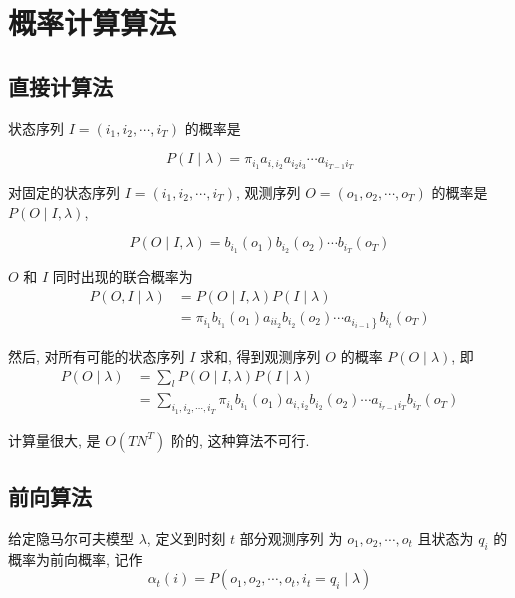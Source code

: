 \section{概率计算算法}

\subsection{直接计算法}

状态序列 $ I=\left(i_{1}, i_{2}, \cdots, i_{T}\right) $ 的概率是

$$ P(I \mid \lambda)=\pi_{i_{1}} a_{i, i_{2}} a_{i_{2} i_{3}} \cdots a_{i_{T-1} i_{T}} $$


对固定的状态序列 $ I=\left(i_{1}, i_{2}, \cdots, i_{T}\right) $, 观测序列 $ O=\left(o_{1}, o_{2}, \cdots, o_{T}\right) $ 的概率是 $ P(O \mid I, \lambda) $,

$$ P(O \mid I, \lambda)=b_{i_{1}}\left(o_{1}\right) b_{i_{2}}\left(o_{2}\right) \cdots b_{i_{T}}\left(o_{T}\right) $$

$ O $ 和 $ I $ 同时出现的联合概率为
$$ 
\begin{aligned}
    P(O, I \mid \lambda)&=P(O \mid I, \lambda) P(I \mid \lambda)\\
    &=\pi_{i_{1}} b_{i_{1}}\left(o_{1}\right) a_{i i_{2}} b_{i_{2}}\left(o_{2}\right) \cdots a_{\left.i_{i-1}\right\}} b_{i_{t}}\left(o_{T}\right)
\end{aligned}
$$

然后, 对所有可能的状态序列 $ I $ 求和, 得到观测序列 $ O $ 的概率 $ P(O \mid \lambda) $, 即
$$ 
\begin{aligned}
    P(O \mid \lambda)
&=\sum_{l} P(O \mid I, \lambda) P(I \mid \lambda) \\
&= \sum_{i_{1}, i_{2}, \cdots, i_{T}} \pi_{i_{1}} b_{i_{1}}\left(o_{1}\right) a_{i, i_{2}} b_{i_{2}}\left(o_{2}\right) \cdots a_{i_{r-1} i_{T}} b_{i_{T}}\left(o_{T}\right) 
\end{aligned}
 $$

\begin{remark}
    计算量很大, 是 $ O\left(T N^{T}\right) $ 阶的, 这种算法不可行.
\end{remark}

\subsection{前向算法}

\begin{definition}[前向概率]
    给定隐马尔可夫模型 $ \lambda $, 定义到时刻 $ t $ 部分观测序列 为 $ o_{1}, o_{2}, \cdots, o_{t} $ 且状态为 $ q_{i} $ 的概率为前向概率, 记作
$$
\alpha_{t}(i)=P\left(o_{1}, o_{2}, \cdots, o_{t}, i_{t}=q_{i} \mid \lambda\right)
$$
\end{definition}


